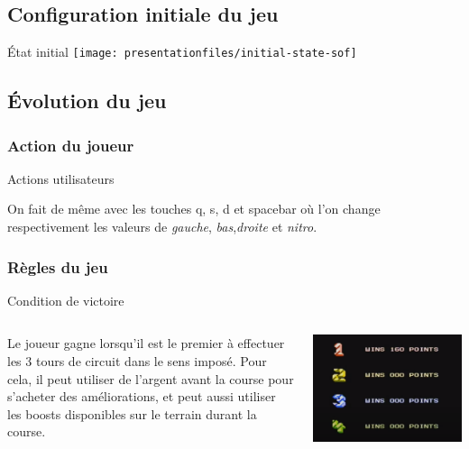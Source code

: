 \documentclass[10pt,dvipsnames,final]{beamer}
\newcommand{\midcolumn}[2]{
\begin{columns}
	\begin{column}{0.5\textwidth}
		#1
	\end{column}
	\begin{column}{0.5\textwidth}
		#2
	\end{column}
\end{columns}
}
\begin{document}
\subsection{Configuration initiale du jeu}

\begin{frame}{État initial}
\texttt{[image: presentationfiles/initial-state-sof]} 
\end{frame}

\subsection{Évolution du jeu}

\subsubsection{Action du joueur}

\begin{frame}{Actions utilisateurs}


On fait de même avec les touches q, s, d et spacebar où l'on change respectivement les valeurs de \emph{gauche}, \emph{bas},\emph{droite} et \emph{nitro}.


\end{frame}

\subsubsection{Règles du jeu}

\begin{frame}{Condition de victoire}
\midcolumn{Le joueur gagne lorsqu'il est le premier à effectuer les 3 tours de circuit dans le sens imposé. Pour cela, il peut utiliser de l'argent avant la course pour s'acheter des améliorations, et peut aussi utiliser les boosts disponibles sur le terrain durant la course.}{\includegraphics[width=\textwidth]{presentationfiles/fin_partie}} 
\end{frame}
\end{document}

